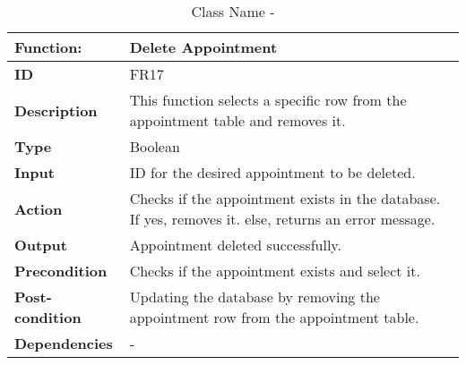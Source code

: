 \documentclass[]{article}
\begin{document}
\FloatBarrier
\begin{table}[h]
\caption{Class Name - }
\label{tab:my-table}
\begin{tabular}{|p{}|p{}|}
\hline
\textbf{Function:} & Delete Appointment
\\ \hline
\textbf{ID}  &   FR17    

\\ \hline
\textbf{Description}    &   This function selects a specific row from the appointment table and removes it.                                                               
\\ \hline
\textbf{Type}    &     Boolean    

\\ \hline
\textbf{Input}        & ID for the desired appointment to be deleted.


\\ \hline
\textbf{Action}            & Checks if the appointment exists in the database. If yes, removes it. else, returns an error message.

\\ \hline
\textbf{Output}            & Appointment deleted successfully.

\\ \hline
\textbf{Precondition}           &   Checks if the appointment exists and select it.

\\ \hline
\textbf{Post-condition}           & Updating the database by removing the appointment row from the appointment table.

\\ \hline
\textbf{Dependencies}           & - 
\\ \hline
\end{tabular}
\end{table}
\end{document}
